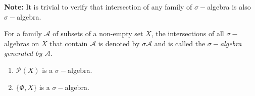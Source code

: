 \documentclass[a4paper,english,12pt]{article}   	%
\begin{document}
{\bf Note:} It is trivial to verify that intersection of any family of $\sigma-$algebra is also $\sigma-$algebra. 
\begin{defn}
 For a family $\mathcal{A}$ of subsets of a non-empty set $X$, the intersections of all $\sigma-$algebras on $X$ that contain $\mathcal{A}$ is denoted by $\sigma{\mathcal{A}}$ and is called the \emph{$\sigma-$algebra generated by $\mathcal{A}$}.
\end{defn}
\begin{exmp}
\begin{enumerate}
  \item $\mathcal{P}(X)$ is a $\sigma-$algebra.
  \item $\{\Phi, X\}$ is a $\sigma-$algebra.
\end{enumerate}

\end{exmp}
\end{document}
